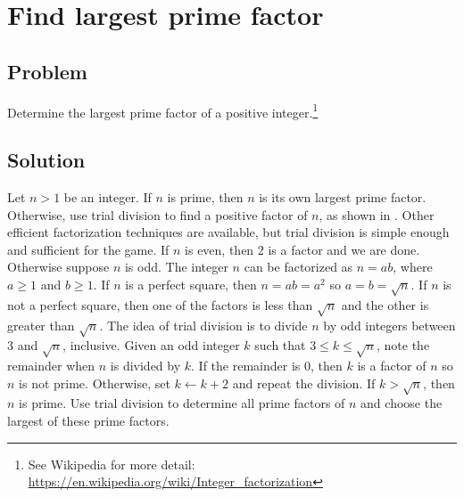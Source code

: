 
\section{Find largest prime factor}



\subsection*{Problem}

Determine the largest prime factor of a positive integer.\footnote{
  See Wikipedia for more detail:
  \url{https://en.wikipedia.org/wiki/Integer_factorization}
}



\subsection*{Solution}

Let $n > 1$ be an integer.  If $n$ is prime, then $n$ is its own
largest prime factor.  Otherwise, use trial division to find a
positive factor of $n$, as shown in .
Other efficient factorization techniques are available, but trial
division is simple enough and sufficient for the game.  If $n$ is
even, then $2$ is a factor and we are done. Otherwise suppose $n$ is
odd.  The integer $n$ can be factorized as $n = ab$, where $a \geq 1$
and $b \geq 1$.  If $n$ is a perfect square, then $n = ab = a^2$ so
$a = b = \sqrt{n}$.  If $n$ is not a perfect square, then one of the
factors is less than $\sqrt{n}$ and the other is greater than
$\sqrt{n}$.  The idea of trial division is to divide $n$ by odd
integers between $3$ and $\sqrt{n}$, inclusive.  Given an odd integer
$k$ such that $3 \leq k \leq \sqrt{n}$, note the remainder when $n$ is
divided by $k$.  If the remainder is $0$, then $k$ is a factor of $n$
so $n$ is not prime.  Otherwise, set $k \gets k + 2$ and repeat the
division.  If $k > \sqrt{n}$, then $n$ is prime.  Use trial division
to determine all prime factors of $n$ and choose the largest of these
prime factors.

\begin{algorithm}[!htbp]

\caption{%
  Determine a factor of an integer.
}
\label{alg:prime:factor}
\end{algorithm}


